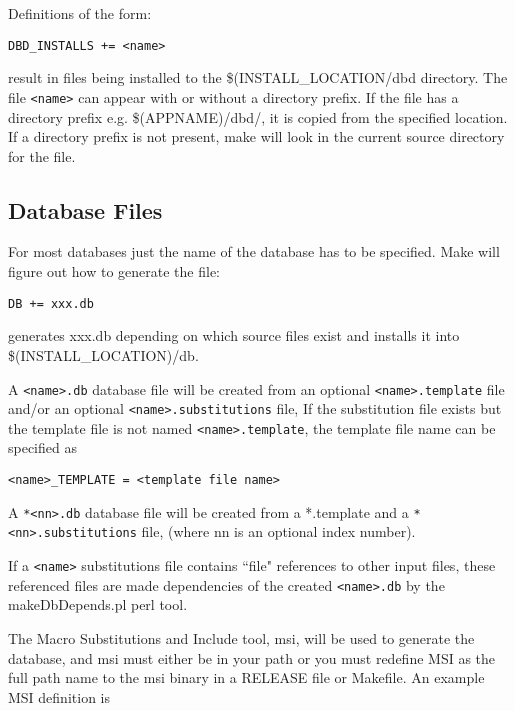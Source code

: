Definitions of the form:

\begin{verbatim}
DBD_INSTALLS += <name>
\end{verbatim}

result in files being installed to the \$(INSTALL\_LOCATION/dbd directory. The file \verb|<name>| can appear with or without 
a directory prefix. If the file has a directory prefix e.g. \$(APPNAME)/dbd/, it is copied from the specified location. If a 
directory prefix is not present, make will look in the current source directory for the file.

\subsection{Database Files}

For most databases just the name of the database has to be specified. Make will figure out how to generate the file: 

\begin{verbatim}
DB += xxx.db
\end{verbatim}

generates xxx.db depending on which source files exist and installs it into \$(INSTALL\_LOCATION)/db.

A \verb|<name>.db| database file will be created from an optional \verb|<name>.template| file and/or an optional 
\verb|<name>.substitutions| file, If the substitution file exists but the template file is not named \verb|<name>.template|, the template 
file name can be specified as

\begin{verbatim}
<name>_TEMPLATE = <template file name>
\end{verbatim}

A \verb|*<nn>.db| database file will be created from a *.template and a \verb|*<nn>.substitutions| file, (where nn is an optional index 
number).

If a \verb|<name>| substitutions file contains ``file" references to other input files, these referenced files are  made dependencies 
of the created \verb|<name>.db| by the makeDbDepends.pl perl tool.

The Macro Substitutions and Include tool, msi, will be used to generate the database, and msi must either be in your path 
or you must redefine MSI as the full path name to the msi binary in a RELEASE file or Makefile. An example MSI 
definition is

